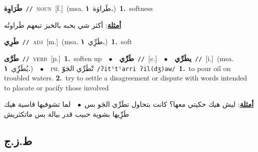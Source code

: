 \documentclass[10pt,a4paper,twoside]{article} %
\begin{document}
\begin{multicols}{2}
{\setlength\topsep{0pt}\textbf{\foreignlanguage{arabic}{طَرَاوِة}}\ {\color{gray}\texttt{//}\color{black}}\ \textsc{noun}\ [f.]\ \color{gray}(msa. \foreignlanguage{arabic}{طَراوَة}~\foreignlanguage{arabic}{\textbf{١.}})\color{black}\ \textbf{1.}~softness\  \begin{flushright}\color{gray}\foreignlanguage{arabic}{\textbf{\underline{\foreignlanguage{arabic}{أمثلة}}}: أكثر شي بحبه بالخبز تبعهم طَراوتُه}\end{flushright}\color{black}} \vspace{2mm}

{\setlength\topsep{0pt}\textbf{\foreignlanguage{arabic}{طَرِي}}\ {\color{gray}\texttt{//}\color{black}}\ \textsc{adj}\ [m.]\ \color{gray}(msa. \foreignlanguage{arabic}{طَرِِّي}~\foreignlanguage{arabic}{\textbf{١.}})\color{black}\ \textbf{1.}~soft\ } \vspace{2mm}

{\setlength\topsep{0pt}\textbf{\foreignlanguage{arabic}{طَرَّى}}\ {\color{gray}\texttt{//}\color{black}}\ \textsc{verb}\ [p.]\ \textbf{1.}~soften up\ \ $\bullet$\ \ \setlength\topsep{0pt}\textbf{\foreignlanguage{arabic}{طَرِّي}}\ {\color{gray}\texttt{//}\color{black}}\ [c.]\ \ $\bullet$\ \ \setlength\topsep{0pt}\textbf{\foreignlanguage{arabic}{يطَرِّي}}\ {\color{gray}\texttt{//}\color{black}}\ [i.]\ \color{gray}(msa. \foreignlanguage{arabic}{يُطَرِِّي}~\foreignlanguage{arabic}{\textbf{١.}})\color{black}\ \ $\bullet$\ \ \textsc{ph.} \color{gray} \foreignlanguage{arabic}{تْطَرِّي الجَوّ}\color{black}\ {\color{gray}\texttt{/{\sffamily ʔitˤtˤarri ʔil(dʒ)aw}/}\color{black}}\ \textbf{1.}~to pour oil on troubled waters.  \textbf{2.}~try to settle a disagreement or dispute with words intended to placate or pacify those involved\  \begin{flushright}\color{gray}\foreignlanguage{arabic}{\textbf{\underline{\foreignlanguage{arabic}{أمثلة}}}: ليش هيك حكيتي معها؟ كانت بتحاول تطَرِّي الجَو بس\ $\bullet$\ \  لما تشوفيها قاسية هيك طَرِِّيها بشوية حبيب قدر بيالة بس ماتكثريش}\end{flushright}\color{black}} \vspace{2mm}

\vspace{-3mm}
\subsection*{\color{blue}\foreignlanguage{arabic}{ط.ز.ج}\color{blue}{ (ntws)}} 


\end{multicols}
\end{document}
